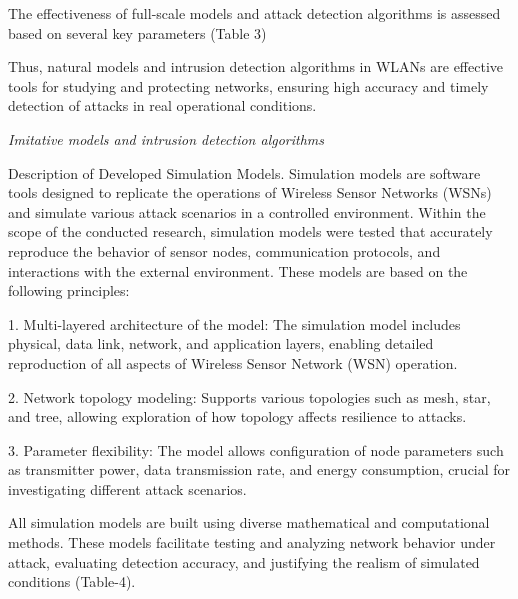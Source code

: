 \begin{multicols}{2}

The effectiveness of full-scale models and attack detection algorithms is assessed based on several key parameters (Table 3) 

Thus, natural models and intrusion detection algorithms in WLANs are
effective tools for studying and protecting networks, ensuring high
accuracy and timely detection of attacks in real operational conditions.

\emph{Imitative models and intrusion detection algorithms}

Description of Developed Simulation Models. Simulation models are
software tools designed to replicate the operations of Wireless Sensor
Networks (WSNs) and simulate various attack scenarios in a controlled
environment. Within the scope of the conducted research, simulation
models were tested that accurately reproduce the behavior of sensor
nodes, communication protocols, and interactions with the external
environment. These models are based on the following principles:

1. Multi-layered architecture of the model: The simulation model
includes physical, data link, network, and application layers, enabling
detailed reproduction of all aspects of Wireless Sensor Network (WSN)
operation.

2. Network topology modeling: Supports various topologies such as mesh,
star, and tree, allowing exploration of how topology affects resilience
to attacks.

3. Parameter flexibility: The model allows configuration of node
parameters such as transmitter power, data transmission rate, and energy
consumption, crucial for investigating different attack scenarios.

All simulation models are built using diverse mathematical and
computational methods. These models facilitate testing and analyzing
network behavior under attack, evaluating detection accuracy, and
justifying the realism of simulated conditions (Table-4).
\end{multicols}



